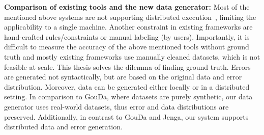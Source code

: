 
\textbf{Comparison of existing tools and the new data generator:} 
Most of the mentioned above systems are not supporting distributed execution~\cite{raha, baran, RekatsinasCIR2017, holodetect, RestatGCS2022, jenga}, limiting the applicability to a single machine.
Another constraint in existing frameworks are hand-crafted rules/constraints or manual labeling (by users).
Importantly, it is difficult to measure the accuracy of the above mentioned tools without ground truth and mostly existing frameworks use manually cleaned datasets, which is not feasible at scale.
This thesis solves the dilemma of finding ground truth.
Errors are generated not syntactically, but are based on the original data and error distribution.
Moreover, data can be generated either locally or in a distributed setting.
In comparison to GouDa, where datasets are purely synthetic, our data generator uses real-world datasets,
thus error and data distributions are preserved. 
Additionally, in contrast to GouDa and Jenga, our system supports distributed data and error generation.

